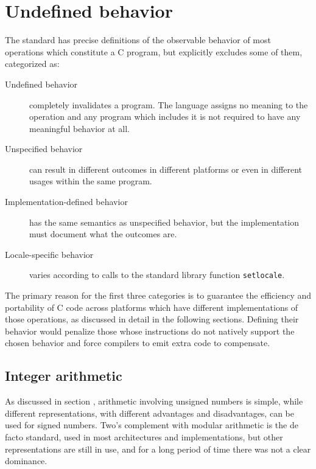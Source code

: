 \section{Undefined behavior}
\label{sec:c:ub}

The standard has precise definitions of the observable behavior of most
operations which constitute a C program, but explicitly excludes some of them,
categorized as:

\begin{description}
    \item[Undefined behavior]
        completely invalidates a program.  The language assigns no meaning to
        the operation and any program which includes it is not required to have
        any meaningful behavior at all.
    \item[Unspecified behavior]
        can result in different outcomes in different platforms or even in
        different usages within the same program.
    \item[Implementation-defined behavior]
        has the same semantics as unspecified behavior, but the implementation
        must document what the outcomes are.
    \item[Locale-specific behavior]
        varies according to calls to the standard library function
        \texttt{setlocale}.
\end{description}

The primary reason for the first three categories is to guarantee the efficiency
and portability of C code across platforms which have different implementations
of those operations, as discussed in detail in the following sections.  Defining
their behavior would penalize those whose instructions do not natively support
the chosen behavior and force compilers to emit extra code to compensate.

\subsection{Integer arithmetic}

As discussed in section , arithmetic involving unsigned
numbers is simple, while different representations, with different advantages
and disadvantages, can be used for signed numbers.  Two's complement with
modular arithmetic is the de facto standard, used in most architectures and
implementations\footnotemark, but other representations are still in use, and
for a long period of time there was not a clear dominance.


